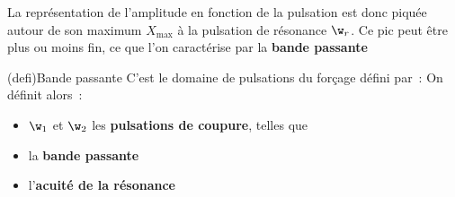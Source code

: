 \documentclass[../../main/main.tex]{subfiles}
\begin{document}
La représentation de l'amplitude en fonction de la pulsation est donc piquée
autour de son maximum $X_{\max}$ à la pulsation de résonance $\w_r$. Ce pic peut
être plus ou moins fin, ce que l'on caractérise par la \textbf{bande passante}
\begin{tcb}[sidebyside, righthand ratio=.4](defi){Bande passante}
	C'est le domaine de pulsations du forçage défini par~:
	\psw{
		\[
			\text{bande passante}
			\triangleq
			\{\w ~|~ X(\w) \geq X\ind{max, eff} = \frac{X\ind{max}}{\sqrt{2}}\}
		\]
	}
	On définit alors~:
	\begin{itemize}
		\item $\w_1$ et $\w_2$ les \textbf{pulsations de coupure}, telles que
		      \psw{%
			      \[
				      X(\w_{1,2}) = \frac{X\ind{max}}{\sqrt{2}}
			      \]
		      }%
		      \vspace{-15pt}
		\item la \textbf{bande passante}
		\item l'\textbf{acuité de la résonance}
	\end{itemize}
	\tcblower
	\begin{center}
\end{center}
\end{tcb}
\end{document}
